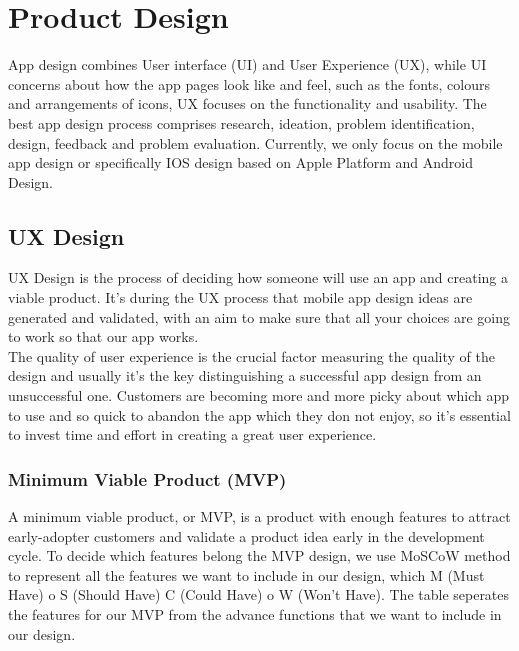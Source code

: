 
\chapter{Product Design} %

\label{Chapter2} %

App design combines User interface (UI) and User Experience (UX), while UI concerns about how the app pages look like and feel, such as the fonts, colours and arrangements of icons, UX focuses on the functionality and usability. The best app design process comprises research, 
ideation, problem identification, design, feedback and problem evaluation. Currently, we only focus on the mobile app design or specifically IOS design based on Apple Platform and Android Design. 
\section{UX Design}
UX Design is the process of deciding how someone will use an app and creating a viable product. It’s during the UX process that mobile app design ideas are generated and validated, with an aim to make sure that all your choices are going to work so that our app works. 
\\The quality of user experience is the crucial factor measuring the quality of the design and usually it's the key distinguishing a successful app design from an unsuccessful one. 
Customers are becoming more and more picky about which app to use and so quick to abandon the app which they don not enjoy, so it's essential to invest time and effort in creating a great user experience.
\subsection{Minimum Viable Product (MVP)}
A minimum viable product, or MVP,  is a product with enough features to attract early-adopter customers and validate a product idea early in the development cycle. To decide which features belong the MVP design, we use MoSCoW method to represent all the features we want to include in our design, which M (Must Have) o S (Should Have) C (Could Have) o W (Won’t Have). 
The table seperates the features for our MVP from the advance functions that we want to include in our design.

